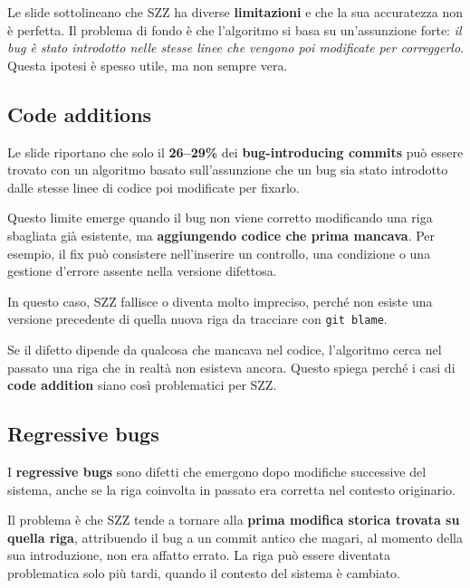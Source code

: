 Le slide sottolineano che SZZ ha diverse \textbf{limitazioni} e che la sua accuratezza non è perfetta. Il problema di fondo è che l'algoritmo si basa su un'assunzione forte: \emph{il bug è stato introdotto nelle stesse linee che vengono poi modificate per correggerlo}. Questa ipotesi è spesso utile, ma non sempre vera.

\subsection{Code additions}

\begin{notaslide}
Le slide riportano che solo il \textbf{26--29\%} dei \textbf{bug-introducing commits} può essere trovato con un algoritmo basato sull'assunzione che un bug sia stato introdotto dalle stesse linee di codice poi modificate per fixarlo.
\end{notaslide}

Questo limite emerge quando il bug non viene corretto modificando una riga sbagliata già esistente, ma \textbf{aggiungendo codice che prima mancava}. Per esempio, il fix può consistere nell'inserire un controllo, una condizione o una gestione d'errore assente nella versione difettosa.

In questo caso, SZZ fallisce o diventa molto impreciso, perché non esiste una versione precedente di quella nuova riga da tracciare con \texttt{git blame}.

\begin{notaprof}
Se il difetto dipende da qualcosa che mancava nel codice, l'algoritmo cerca nel passato una riga che in realtà non esisteva ancora. Questo spiega perché i casi di \textbf{code addition} siano così problematici per SZZ.
\end{notaprof}

\subsection{Regressive bugs}

I \textbf{regressive bugs} sono difetti che emergono dopo modifiche successive del sistema, anche se la riga coinvolta in passato era corretta nel contesto originario.

Il problema è che SZZ tende a tornare alla \textbf{prima modifica storica trovata su quella riga}, attribuendo il bug a un commit antico che magari, al momento della sua introduzione, non era affatto errato. La riga può essere diventata problematica solo più tardi, quando il contesto del sistema è cambiato.

